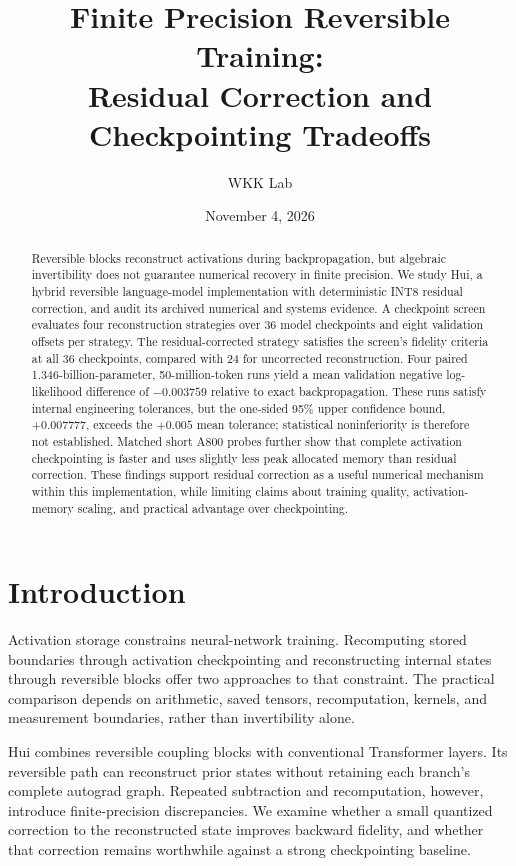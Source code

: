 \documentclass[10pt]{article}
\title{Finite Precision Reversible Training:\\Residual Correction and Checkpointing Tradeoffs}
\author{WKK Lab}
\date{November 4, 2026}
\begin{document}
\maketitle
\begin{abstract}
Reversible blocks reconstruct activations during backpropagation, but algebraic invertibility does not guarantee numerical recovery in finite precision. We study Hui, a hybrid reversible language-model implementation with deterministic INT8 residual correction, and audit its archived numerical and systems evidence. A checkpoint screen evaluates four reconstruction strategies over 36 model checkpoints and eight validation offsets per strategy. The residual-corrected strategy satisfies the screen's fidelity criteria at all 36 checkpoints, compared with 24 for uncorrected reconstruction. Four paired 1.346-billion-parameter, 50-million-token runs yield a mean validation negative log-likelihood difference of $-0.003759$ relative to exact backpropagation. These runs satisfy internal engineering tolerances, but the one-sided 95\% upper confidence bound, $+0.007777$, exceeds the $+0.005$ mean tolerance; statistical noninferiority is therefore not established. Matched short A800 probes further show that complete activation checkpointing is faster and uses slightly less peak allocated memory than residual correction. These findings support residual correction as a useful numerical mechanism within this implementation, while limiting claims about training quality, activation-memory scaling, and practical advantage over checkpointing.
\end{abstract}

\section{Introduction}
Activation storage constrains neural-network training. Recomputing stored boundaries through activation checkpointing and reconstructing internal states through reversible blocks offer two approaches to that constraint. The practical comparison depends on arithmetic, saved tensors, recomputation, kernels, and measurement boundaries, rather than invertibility alone.

Hui combines reversible coupling blocks with conventional Transformer layers. Its reversible path can reconstruct prior states without retaining each branch's complete autograd graph. Repeated subtraction and recomputation, however, introduce finite-precision discrepancies. We examine whether a small quantized correction to the reconstructed state improves backward fidelity, and whether that correction remains worthwhile against a strong checkpointing baseline.
\end{document}
